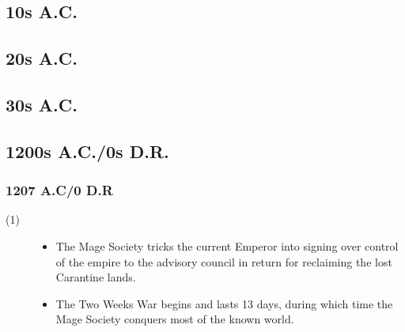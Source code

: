 \documentclass[a4paper, 11pt]{article}
\def\level#1{\item[(#1)\hspace{9.5pt}]}
\newenvironment{knowlevels}{\begin{description}}{\end{description}} %
\begin{document}
\subsection{10s A.C.}
\subsection{20s A.C.}
\subsection{30s A.C.}

\subsection{1200s A.C./0s D.R.}
\subsubsection{1207 A.C/0 D.R}
\begin{knowlevels}
  \level{1} {
    \begin{itemize}
      \item The Mage Society tricks the current Emperor into signing over control of the empire to the advisory council in return for reclaiming the lost Carantine lands.
      \item The Two Weeks War begins and lasts 13 days, during which time the Mage Society conquers most of the known world. 
    \end{itemize}
}
\end{knowlevels}
\end{document}
